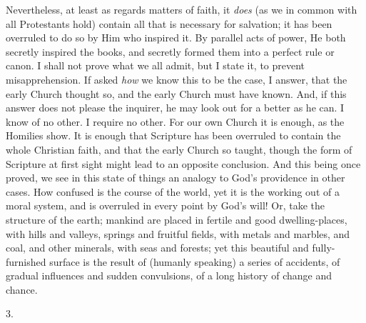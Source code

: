 Nevertheless, at least as regards matters of faith, it \emph{does}
(as we in common with all Protestants hold) contain all that is
necessary for salvation; it has been overruled to do so by Him who
inspired it. By parallel acts of power, He both secretly inspired the
books, and secretly formed them into a perfect rule or canon. I shall
not prove what we all admit, but I state it, to prevent
misapprehension. If asked \emph{how} we know this to be the case, I
answer, that the early Church thought so, and the early Church must
have known. And, if this answer does not please the inquirer, he may
look out for a better as he can. I know of no other. I require no
other. For our own Church it is enough, as the Homilies show. It is
enough that Scripture has been overruled to contain the whole
Christian faith, and that the early Church so taught, though the form
of Scripture at first sight might lead to an opposite conclusion. And
this being once proved, we see in this state of things an analogy to
God's providence in other cases. How confused is the course of the
world, yet it is the working out of a moral system, and is overruled
in every point by God's will! Or, take the structure of the earth;
mankind are placed in fertile and good dwelling-places, with hills and
valleys, springs and fruitful fields, with metals and marbles,
and coal, and other minerals, with seas and forests; yet this
beautiful and fully-furnished surface is the result of (humanly
speaking) a series of accidents, of gradual influences and sudden
convulsions, of a long history of change and chance.

3.

